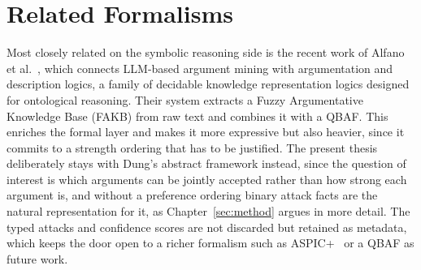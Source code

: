 \section{Related Formalisms}
\label{sec:related:formalisms}

Most closely related on the symbolic reasoning side is the recent work of
Alfano et al.~\cite{alfano2026}, which connects LLM-based argument mining with
argumentation and description logics, a family of decidable knowledge
representation logics designed for ontological reasoning. Their system extracts
a Fuzzy Argumentative Knowledge Base (FAKB) from raw text and combines it with
a QBAF. This enriches the formal layer and makes it more expressive but also
heavier, since it
commits to a strength ordering that has to be justified. The present thesis deliberately stays with
Dung's abstract framework instead, since the question of interest is which
arguments can be jointly accepted rather than how strong each argument is, and
without a preference ordering binary attack facts are the natural
representation for it,
as Chapter~\ref{sec:method} argues in more detail. The typed attacks and
confidence scores are not discarded but retained as metadata, which keeps the
door open to a richer formalism such as ASPIC+~\cite{modgil2014} or a QBAF as
future work.

